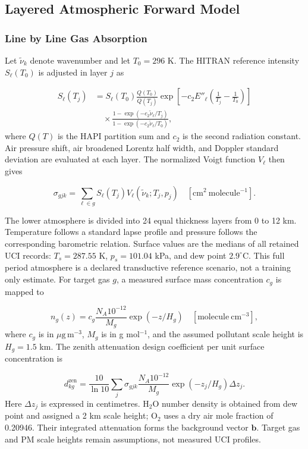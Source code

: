 \documentclass[conference]{IEEEtran}
\newcommand{\ugm}{\ensuremath{\mu\mathrm{g\,m}^{-3}}}
\begin{document}
\subsection{Layered Atmospheric Forward Model}

\subsubsection{Line by Line Gas Absorption}

Let $\tilde{\nu}_k$ denote wavenumber and let $T_0=296$ K. The HITRAN reference intensity $S_\ell(T_0)$ is adjusted in layer $j$ as

\begin{align}
S_\ell(T_j) &= S_\ell(T_0)\frac{Q(T_0)}{Q(T_j)}
\exp\!\left[-c_2E''_\ell\left(\frac{1}{T_j}-\frac{1}{T_0}\right)\right]
\nonumber\\
&\quad \times
\frac{1-\exp(-c_2\tilde{\nu}_\ell/T_j)}
{1-\exp(-c_2\tilde{\nu}_\ell/T_0)},
\label{eq:intensity}
\end{align}
where $Q(T)$ is the HAPI partition sum and $c_2$ is the second radiation constant. Air pressure shift, air broadened Lorentz half width, and Doppler standard deviation are evaluated at each layer. The normalized Voigt function $V_\ell$ then gives

\begin{equation}
\sigma_{gjk}=\sum_{\ell\in g}S_\ell(T_j)
V_\ell(\tilde{\nu}_k;T_j,p_j)
\quad [\mathrm{cm^2\ molecule^{-1}}].
\label{eq:crosssection}
\end{equation}

The lower atmosphere is divided into 24 equal thickness layers from 0 to 12 km. Temperature follows a standard lapse profile and pressure follows the corresponding barometric relation. Surface values are the medians of all retained UCI records: $T_s=287.55$ K, $p_s=101.04$ kPa, and dew point $2.9^\circ$C. This full period atmosphere is a declared transductive reference scenario, not a training only estimate. For target gas $g$, a measured surface mass concentration $c_g$ is mapped to

\begin{equation}
n_g(z)=c_g\frac{N_A10^{-12}}{M_g}\exp(-z/H_g)
\quad [\mathrm{molecule\ cm^{-3}}],
\label{eq:profile}
\end{equation}
where $c_g$ is in \ugm, $M_g$ is in g mol$^{-1}$, and the assumed pollutant scale height is $H_g=1.5$ km. The zenith attenuation design coefficient per unit surface concentration is

\begin{equation}
d^{\mathrm{zen}}_{kg}=\frac{10}{\ln 10}
\sum_j \sigma_{gjk}\frac{N_A10^{-12}}{M_g}
\exp(-z_j/H_g)\Delta z_j.
\label{eq:gasdesign}
\end{equation}
Here $\Delta z_j$ is expressed in centimetres. H$_2$O number density is obtained from dew point and assigned a 2 km scale height; O$_2$ uses a dry air mole fraction of 0.20946. Their integrated attenuation forms the background vector $\boldsymbol b$. Target gas and PM scale heights remain assumptions, not measured UCI profiles.
\end{document}
